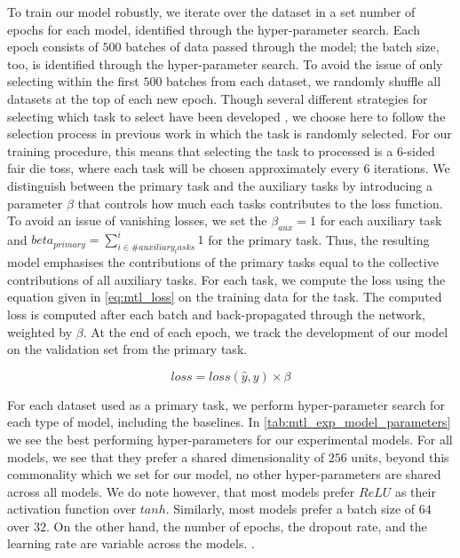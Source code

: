 To train our model robustly, we iterate over the dataset in a set number of epochs for each model, identified through the hyper-parameter search. Each epoch consists of $500$ batches of data passed through the model; the batch size, too, is identified through the hyper-parameter search. To avoid the issue of only selecting within the first $500$ batches from each dataset, we randomly shuffle all datasets at the top of each new epoch. Though several different strategies for selecting which task to select have been developed \cite{Waseem:2018}, we choose here to follow the selection process in previous work \cite{Waseem:2018,Rajamanickam:2020} in which the task is randomly selected. For our training procedure, this means that selecting the task to processed is a 6-sided fair die toss, where each task will be chosen approximately every $6$ iterations. We distinguish between the primary task and the auxiliary tasks by introducing a parameter $\beta$ that controls how much each tasks contributes to the loss function. To avoid an issue of vanishing losses, we set the $\beta_{aux} = 1$ for each auxiliary task and $beta_{primary} = \sum^{i}_{i \in \#auxiliary_tasks} 1$ for the primary task. Thus, the resulting model emphasises the contributions of the primary tasks equal to the collective contributions of all auxiliary tasks. For each task, we compute the loss using the equation given in \autoref{eq:mtl_loss} on the training data for the task. The computed loss is computed after each batch and back-propagated through the network, weighted by $\beta$. At the end of each epoch, we track the development of our model on the validation set from the primary task.

\begin{equation}\label{eq:mtl_loss}
  loss = loss(\hat{y}, y) \times \beta
\end{equation}

For each dataset used as a primary task, we perform hyper-parameter search for each type of model, including the baselines. In \autoref{tab:mtl_exp_model_parameters} we see the best performing hyper-parameters for our experimental models. For all models, we see that they prefer a shared dimensionality of $256$ units, beyond this commonality which we set for our model, no other hyper-parameters are shared across all models. We do note however, that most models prefer $ReLU$ as their activation function over $tanh$. Similarly, most models prefer a batch size of $64$ over $32$. On the other hand, the number of epochs, the dropout rate, and the learning rate are variable across the models.
.

